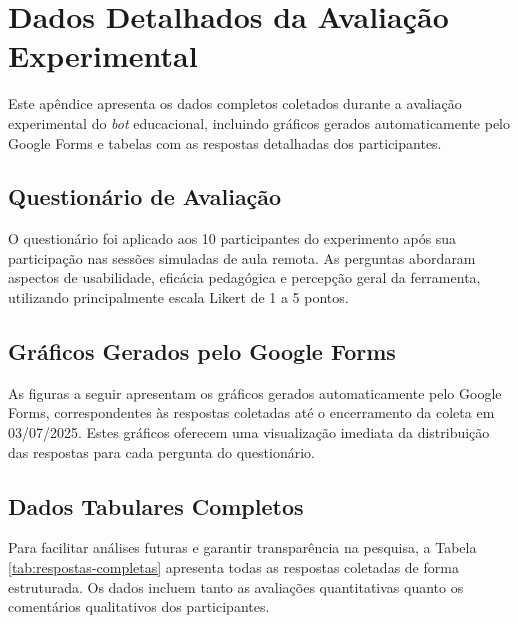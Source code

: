 \chapter{Dados Detalhados da Avaliação Experimental}
\label{cap:dados-experimentais}

Este apêndice apresenta os dados completos coletados durante a avaliação
experimental do \textit{bot} educacional, incluindo gráficos gerados
automaticamente pelo Google Forms e tabelas com as respostas detalhadas dos
participantes.

\section{Questionário de Avaliação}
\label{sec:questionario}

O questionário foi aplicado aos 10 participantes do experimento após sua
participação nas sessões simuladas de aula remota. As perguntas abordaram
aspectos de usabilidade, eficácia pedagógica e percepção geral da ferramenta,
utilizando principalmente escala Likert de 1 a 5 pontos.

\section{Gráficos Gerados pelo Google Forms}
\label{sec:graficos-forms}

As figuras a seguir apresentam os gráficos gerados automaticamente pelo Google
Forms, correspondentes às respostas coletadas até o encerramento da coleta em
03/07/2025. Estes gráficos oferecem uma visualização imediata da distribuição
das respostas para cada pergunta do questionário.



\section{Dados Tabulares Completos}
\label{sec:dados-tabulares}

Para facilitar análises futuras e garantir transparência na pesquisa, a Tabela
\ref{tab:respostas-completas} apresenta todas as respostas coletadas de forma
estruturada. Os dados incluem tanto as avaliações quantitativas quanto os
comentários qualitativos dos participantes.

